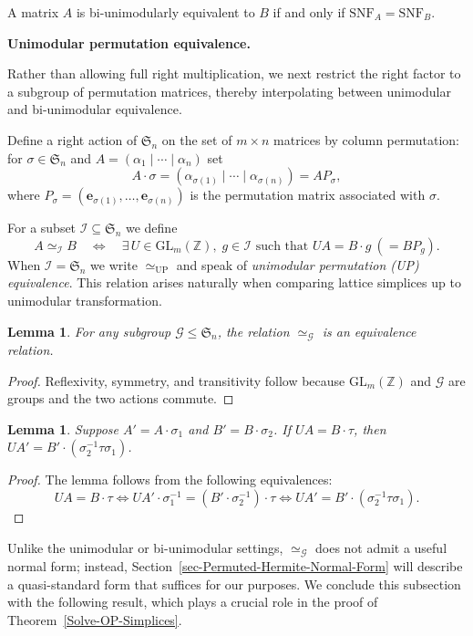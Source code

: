 \documentclass[reqno, 12pt]{article}
\newtheorem{lem}[thm]{Lemma}
\theoremstyle{mydefinition}
\theoremstyle{myremark}
\numberwithin{algorithm}{section}
\def\Z{\mathbb{Z}}
\begin{document}
A matrix $A$ is bi-unimodularly equivalent to $B$ if and only if $\mathrm{SNF}_A=\mathrm{SNF}_B$.

\medskip
\noindent\textbf{Unimodular permutation equivalence.}\

Rather than allowing full right multiplication, we next restrict the right factor to a subgroup of permutation matrices, thereby interpolating between unimodular and bi-unimodular equivalence.

Define a right action of $\mathfrak{S}_n$ on the set of $m\times n$ matrices by column permutation: for $\sigma\in\mathfrak{S}_n$ and $A=(\alpha_1\mid\cdots\mid\alpha_n)$ set
\[
A \cdot \sigma = (\alpha_{\sigma(1)}\mid\cdots\mid\alpha_{\sigma(n)}) = AP_\sigma,
\]
where $P_\sigma = (\mathbf{e}_{\sigma(1)},\dots,\mathbf{e}_{\sigma(n)})$ is the permutation matrix associated with $\sigma$.

For a subset $\mathcal I \subseteq \mathfrak{S}_n$ we define
\[
A \simeq_{\mathcal{I}} B \quad\iff\quad \exists\, U \in \mathrm{GL}_m(\Z),\; g \in \mathcal{I} \text{ such that } UA = B \cdot g \ (=BP_g).
\]
When $\mathcal I=\mathfrak{S}_n$ we write $\simeq_{\mathrm{UP}}$ and speak of \emph{unimodular permutation (UP) equivalence}.  This relation arises naturally when comparing lattice simplices up to unimodular transformation.


\begin{lem}
For any subgroup $\mathcal G \leq \mathfrak{S}_n$, the relation $\simeq_{\mathcal{G}}$ is an equivalence relation.
\end{lem}
\begin{proof}
Reflexivity, symmetry, and transitivity follow because $\mathrm{GL}_m(\Z)$ and $\mathcal G$ are groups and the two actions commute.
\end{proof}

\begin{lem}\label{lem-permute-A-B}
Suppose $A'=A \cdot\sigma_1$ and $B'=B\cdot\sigma_2$.
 If $UA =B \cdot\tau$, then $ UA' = B' \cdot (\sigma_2^{-1} \tau \sigma_1) $.
\end{lem}

\begin{proof}
The lemma follows from the following equivalences:
    \[
        UA = B \cdot \tau
        \iff UA' \cdot \sigma_1^{-1} = (B' \cdot \sigma_2^{-1}) \cdot \tau
        \iff UA' = B' \cdot (\sigma_2^{-1} \tau \sigma_1).
    \]
\end{proof}

Unlike the unimodular or bi-unimodular settings,  $\simeq_{\mathcal{G}}$ does not admit a useful normal form; instead, Section~\ref{sec-Permuted-Hermite-Normal-Form} will describe a quasi-standard form that suffices for our purposes.
We conclude this subsection with the following result, which plays a crucial role in the proof of Theorem~\ref{Solve-OP-Simplices}.
\end{document}
